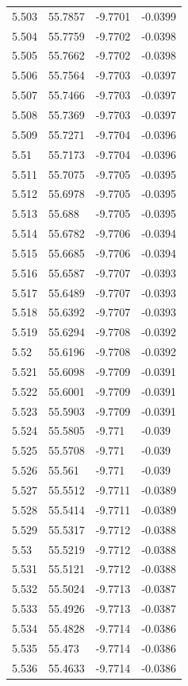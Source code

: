 \begin{tabular}{llll}
5.503 & 55.7857 & -9.7701 & -0.0399 \\
5.504 & 55.7759 & -9.7702 & -0.0398 \\
5.505 & 55.7662 & -9.7702 & -0.0398 \\
5.506 & 55.7564 & -9.7703 & -0.0397 \\
5.507 & 55.7466 & -9.7703 & -0.0397 \\
5.508 & 55.7369 & -9.7703 & -0.0397 \\
5.509 & 55.7271 & -9.7704 & -0.0396 \\
5.51 & 55.7173 & -9.7704 & -0.0396 \\
5.511 & 55.7075 & -9.7705 & -0.0395 \\
5.512 & 55.6978 & -9.7705 & -0.0395 \\
5.513 & 55.688 & -9.7705 & -0.0395 \\
5.514 & 55.6782 & -9.7706 & -0.0394 \\
5.515 & 55.6685 & -9.7706 & -0.0394 \\
5.516 & 55.6587 & -9.7707 & -0.0393 \\
5.517 & 55.6489 & -9.7707 & -0.0393 \\
5.518 & 55.6392 & -9.7707 & -0.0393 \\
5.519 & 55.6294 & -9.7708 & -0.0392 \\
5.52 & 55.6196 & -9.7708 & -0.0392 \\
5.521 & 55.6098 & -9.7709 & -0.0391 \\
5.522 & 55.6001 & -9.7709 & -0.0391 \\
5.523 & 55.5903 & -9.7709 & -0.0391 \\
5.524 & 55.5805 & -9.771 & -0.039 \\
5.525 & 55.5708 & -9.771 & -0.039 \\
5.526 & 55.561 & -9.771 & -0.039 \\
5.527 & 55.5512 & -9.7711 & -0.0389 \\
5.528 & 55.5414 & -9.7711 & -0.0389 \\
5.529 & 55.5317 & -9.7712 & -0.0388 \\
5.53 & 55.5219 & -9.7712 & -0.0388 \\
5.531 & 55.5121 & -9.7712 & -0.0388 \\
5.532 & 55.5024 & -9.7713 & -0.0387 \\
5.533 & 55.4926 & -9.7713 & -0.0387 \\
5.534 & 55.4828 & -9.7714 & -0.0386 \\
5.535 & 55.473 & -9.7714 & -0.0386 \\
5.536 & 55.4633 & -9.7714 & -0.0386 \\

\end{tabular}
